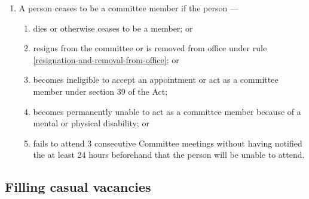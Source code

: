 \documentclass[../constitution.tex]{subfiles}
\begin{document}
\begin{enumerate}

\item A person ceases to be a committee member if the person ---

  \begin{enumerate}
  
  \item dies or otherwise ceases to be a member; or
  \item resigns from the committee or is removed from office under rule \ref{resignation-and-removal-from-office}; or
  \item becomes ineligible to accept an appointment or act as a committee member under section 39 of the Act;
  \item becomes permanently unable to act as a committee member because of a mental or physical disability; or
  \item fails to attend 3 consecutive Committee meetings without having notified the  at least 24 hours beforehand that the person will be unable to attend.
  \end{enumerate}
\end{enumerate}


\hypertarget{filling-casual-vacancies}{%
\subsection{Filling casual vacancies}\label{filling-casual-vacancies}}
\end{document}
